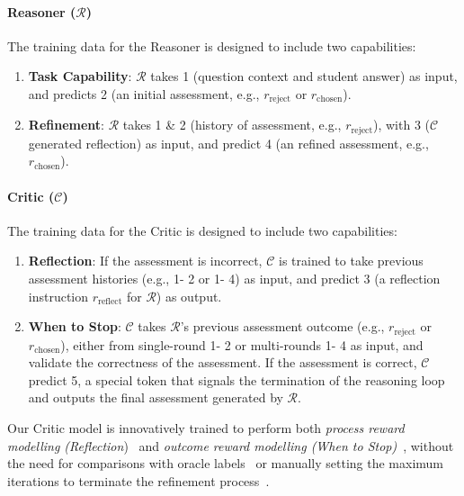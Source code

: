 \paragraph{Reasoner (\(\mathcal{R}\))}
The training data for the Reasoner is designed to include two capabilities:
\begin{enumerate}[leftmargin=*,noitemsep,topsep=0pt]
    \item \textbf{Task Capability}: \(\mathcal{R}\) takes \textcircled{\raisebox{-0.3pt} {\scriptsize1}} (question context and student answer) as input, and predicts \textcircled{\raisebox{-0.3pt} {\scriptsize2}}  (an initial assessment, e.g., $r_{\text{reject}}$ or $r_{\text{chosen}}$).
    \item \textbf{Refinement}: \(\mathcal{R}\) takes \textcircled{\raisebox{-0.3pt} {\scriptsize1}} \& \textcircled{\raisebox{-0.3pt} {\scriptsize2}} (history of assessment, e.g., $r_{\text{reject}}$), with \textcircled{\raisebox{-0.3pt} {\scriptsize3}} (\(\mathcal{C}\) generated reflection) as input, and predict \textcircled{\raisebox{-0.3pt} {\scriptsize4}} (an refined assessment, e.g., $r_{\text{chosen}}$).
\end{enumerate}
\vspace{-2mm}
\paragraph{Critic (\(\mathcal{C}\))}
The training data for the Critic is designed to include two capabilities:
\begin{enumerate}[leftmargin=*,noitemsep,topsep=0pt]
\item \textbf{Reflection}: If the assessment is incorrect, \(\mathcal{C}\) is trained to take previous assessment histories (e.g., \textcircled{\raisebox{-0.3pt} {\scriptsize1}}-\textcircled{\raisebox{-0.3pt} {\scriptsize2}} or \textcircled{\raisebox{-0.3pt} {\scriptsize1}}-\textcircled{\raisebox{-0.3pt} {\scriptsize4}}) as input, and predict \textcircled{\raisebox{-0.3pt} {\scriptsize3}} (a reflection instruction $r_{\text{reflect}}$ for \(\mathcal{R}\)) as output.
\item \textbf{When to Stop}: \(\mathcal{C}\) takes \(\mathcal{R}\)'s previous assessment outcome (e.g., $r_{\text{reject}}$ or $r_{\text{chosen}}$), either from single-round \textcircled{\raisebox{-0.3pt} {\scriptsize1}}-\textcircled{\raisebox{-0.3pt} {\scriptsize2}} or multi-rounds \textcircled{\raisebox{-0.3pt} {\scriptsize1}}-\textcircled{\raisebox{-0.3pt} {\scriptsize4}} as input, and validate the correctness of the assessment. If the assessment is correct, \(\mathcal{C}\) predict \textcircled{\raisebox{-0.3pt} {\scriptsize5}}, a special token that signals the termination of the reasoning loop and outputs the final assessment generated by \(\mathcal{R}\).
\end{enumerate}
Our Critic model is innovatively trained to perform both \emph{process reward modelling (Reflection})~\cite{lightman2024lets, wang-etal-2024-math} and \emph{outcome reward modelling (When to Stop)}~\cite{instruct_following}, without the need for comparisons with oracle labels~\cite{shinn2023reflexion, kim2023language} or manually setting the maximum iterations to terminate the refinement process~\cite{selfrefine, li-etal-2024-hindsight}.
\vspace{-2mm}
